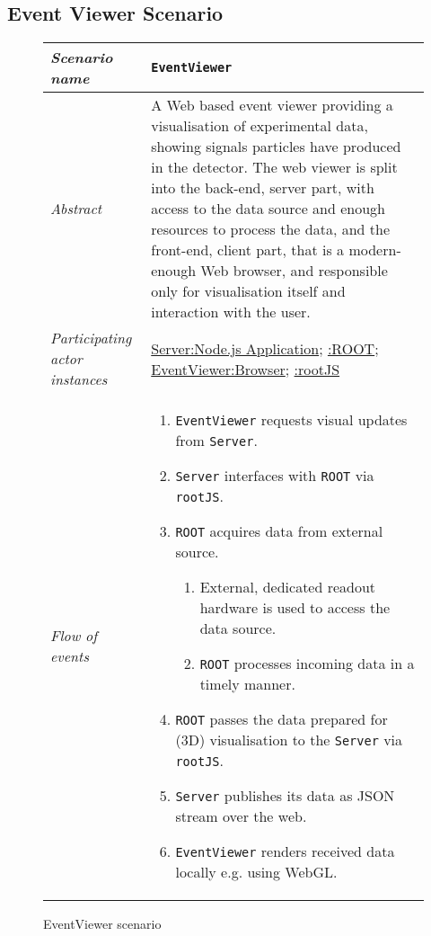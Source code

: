 \subsection{Event Viewer Scenario}
\begin{figure}[htb]
	\centering
	\begin{longtable}{p{3cm} @{\hskip 1cm} p{12cm}}
		\hline
		\textit{Scenario name} & \texttt{EventViewer}\\
		\hline
		\textit{Abstract} &
		A Web based event viewer providing a visualisation of experimental data, showing signals particles have produced in the detector.
		The web viewer is split into the back-end, server part, with access to
	    the data source and enough resources to process the data, and the front-end, client part, that is a modern-enough Web browser, and responsible only for visualisation itself and interaction with the user.
		\\
		\hline
		\textit{Participating actor instances} & 
		\underline{Server:Node.js Application}; \underline{:ROOT}; \underline{EventViewer:Browser}; \underline{:rootJS}\\
		\hline
		\textit{Flow of events} &
		\begin{enumerate}
			\item \texttt{EventViewer} requests visual updates from \texttt{Server}.
			\item \texttt{Server} interfaces with \texttt{ROOT} via \texttt{rootJS}.
			\item \texttt{ROOT} acquires data from external source.
			\begin{enumerate}
					\item External, dedicated readout hardware is used to access the data source.
					\item \texttt{ROOT} processes incoming data in a timely manner.
			\end{enumerate}
			\item \texttt{ROOT} passes the data prepared for (3D) visualisation to the \texttt{Server} via \texttt{rootJS}.
			\item \texttt{Server} publishes its data as JSON stream over the web.
			\item \texttt{EventViewer} renders received data locally e.g. using WebGL.
		\end{enumerate}
		\\
		\hline
	\end{longtable}
	\caption{EventViewer scenario}
\end{figure}
